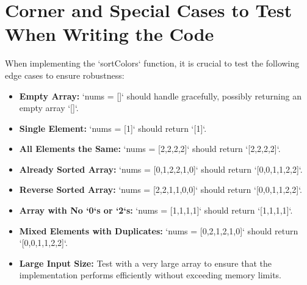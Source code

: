 \section*{Corner and Special Cases to Test When Writing the Code}
When implementing the `sortColors` function, it is crucial to test the following edge cases to ensure robustness:

\begin{itemize}
    \item \textbf{Empty Array:} `nums = []` should handle gracefully, possibly returning an empty array `[]`.
    
    \item \textbf{Single Element:} `nums = [1]` should return `[1]`.
    
    \item \textbf{All Elements the Same:} `nums = [2,2,2,2]` should return `[2,2,2,2]`.
    
    \item \textbf{Already Sorted Array:} `nums = [0,1,2,2,1,0]` should return `[0,0,1,1,2,2]`.
    
    \item \textbf{Reverse Sorted Array:} `nums = [2,2,1,1,0,0]` should return `[0,0,1,1,2,2]`.
    
    \item \textbf{Array with No `0`s or `2`s:} `nums = [1,1,1,1]` should return `[1,1,1,1]`.
    
    \item \textbf{Mixed Elements with Duplicates:} `nums = [0,2,1,2,1,0]` should return `[0,0,1,1,2,2]`.
    
    \item \textbf{Large Input Size:} Test with a very large array to ensure that the implementation performs efficiently without exceeding memory limits.
\end{itemize}

\printindex